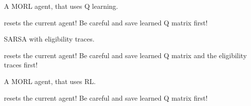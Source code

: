 \documentclass[letterpaper,10pt,english]{sphinxmanual}
\begin{document}

\begin{fulllineitems}
\label{Agents:morl_agents.QMorlAgent}
A MORL agent, that uses Q learning.

\begin{fulllineitems}
\label{Agents:morl_agents.QMorlAgent.reset}
resets the current agent! Be careful and save learned Q matrix first!

\end{fulllineitems}


\end{fulllineitems}


\begin{fulllineitems}
\label{Agents:morl_agents.SARSALambdaMorlAgent}
SARSA with eligibility traces.

\begin{fulllineitems}
\label{Agents:morl_agents.SARSALambdaMorlAgent.reset}
resets the current agent! Be careful and save learned Q matrix and the eligibility traces first!

\end{fulllineitems}


\end{fulllineitems}


\begin{fulllineitems}
\label{Agents:morl_agents.SARSAMorlAgent}
A MORL agent, that uses RL.

\begin{fulllineitems}
\label{Agents:morl_agents.SARSAMorlAgent.reset}
resets the current agent! Be careful and save learned Q matrix first!

\end{fulllineitems}


\end{fulllineitems}
\end{document}
